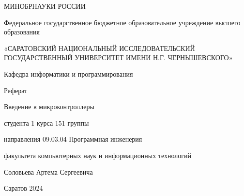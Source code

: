 \pagestyle{empty}

	\begin{center}
		МИНОБРНАУКИ РОССИИ
		  
		Федеральное государственное бюджетное образовательное учреждение высшего образования
		
		«САРАТОВСКИЙ НАЦИОНАЛЬНЫЙ ИССЛЕДОВАТЕЛЬСКИЙ ГОСУДАРСТВЕННЫЙ УНИВЕРСИТЕТ ИМЕНИ Н.Г. ЧЕРНЫШЕВСКОГО»
		
	\end{center}

\vspace{2 cm}

\begin{flushright}
	Кафедра информатики и программирования
\end{flushright}

\vspace{2 cm}

\begin{center}
	Реферат
	
	Введение в микроконтроллеры
\end{center}
\vspace{5 cm}
\begin{flushleft}
	студента 1 курса 151 группы
	
	направления 09.03.04 Программная инженерия
	
	факультета компьютерных наук и информационных технологий
	
	Соловьева Артема Сергеевича 
	
\end{flushleft}

\vspace{7 cm}
\begin{center}
	Саратов 2024
	
	
\end{center}
\newpage

\tableofcontents



\newpage

\pagestyle{plain}